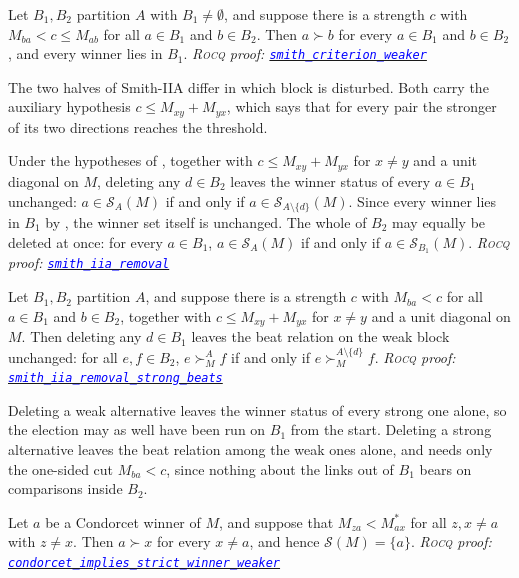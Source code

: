 \documentclass[a4paper,UKenglish,cleveref,autoref,thm-restate,anonymous]{lipics-v2021}
\newcommand{\Mstar}{M^{\ast}}
\newcommand{\rocq}{\textsc{Rocq}}
\newcommand{\anonrepo}{https://anonymous.4open.science/r/Semiring_graph_algorithm-000E}
\newcommand{\rocqfile}[2]{\href{\anonrepo/#1}{\textcolor{blue}{\texttt{#2}}}}
\newcommand{\proofat}[2]{{\footnotesize\itshape\rocq{} proof: \rocqfile{#1}{#2}}}
\begin{document}
\begin{theorem}\label{thm:smith}
Let $B_1, B_2$ partition $A$ with $B_1 \neq \emptyset$, and suppose there is
a strength $c$ with $M_{ba} < c \leq M_{ab}$ for all $a \in B_1$ and
$b \in B_2$. Then $a \succ b$ for every $a \in B_1$ and $b \in B_2$, and
every winner lies in $B_1$.
\proofat{algorithm/SmithN.v}{smith\_criterion\_weaker}
\end{theorem}

The two halves of Smith-IIA differ in which block is disturbed. Both carry
the auxiliary hypothesis $c \leq M_{xy} + M_{yx}$, which says that for
every pair the stronger of its two directions reaches the threshold.

\begin{theorem}\label{thm:smithiia}
Under the hypotheses of , together with
$c \leq M_{xy} + M_{yx}$ for $x \neq y$ and a unit diagonal on $M$,
deleting any $d \in B_2$ leaves the winner status of every $a \in B_1$
unchanged: $a \in \mathcal{S}_{A}(M)$ if and only if
$a \in \mathcal{S}_{A \setminus \{d\}}(M)$. Since every winner lies in
$B_1$ by , the winner set itself is unchanged. The whole of
$B_2$ may equally be deleted at once: for every $a \in B_1$,
$a \in \mathcal{S}_{A}(M)$ if and only if $a \in \mathcal{S}_{B_1}(M)$.
\proofat{algorithm/SmithiiaN.v}{smith\_iia\_removal}
\end{theorem}

\begin{theorem}\label{thm:smithiiastrong}
Let $B_1, B_2$ partition $A$, and suppose there is a strength $c$ with
$M_{ba} < c$ for all $a \in B_1$ and $b \in B_2$, together with
$c \leq M_{xy} + M_{yx}$ for $x \neq y$ and a unit diagonal on $M$. Then
deleting any $d \in B_1$ leaves the beat relation on the weak block
unchanged: for all $e, f \in B_2$, \;
$e \succ^{A}_{M} f$ if and only if $e \succ^{A \setminus \{d\}}_{M} f$.
\proofat{algorithm/SmithiiaN.v}{smith\_iia\_removal\_strong\_beats}
\end{theorem}

Deleting a weak alternative leaves the winner status of every strong one
alone, so the election may as well have been run on $B_1$ from the start.
Deleting a strong alternative leaves the beat relation among the weak
ones alone, and needs only the one-sided cut $M_{ba} < c$, since nothing
about the links out of $B_1$ bears on comparisons inside $B_2$.

\begin{theorem}\label{thm:condorcet}
Let $a$ be a Condorcet winner of $M$, and suppose that
$M_{za} < \Mstar_{ax}$ for all $z, x \neq a$ with $z \neq x$. Then
$a \succ x$ for every $x \neq a$, and hence $\mathcal{S}(M) = \{a\}$.
\proofat{algorithm/CondorcetN.v}{condorcet\_implies\_strict\_winner\_weaker}
\end{theorem}
\end{document}
